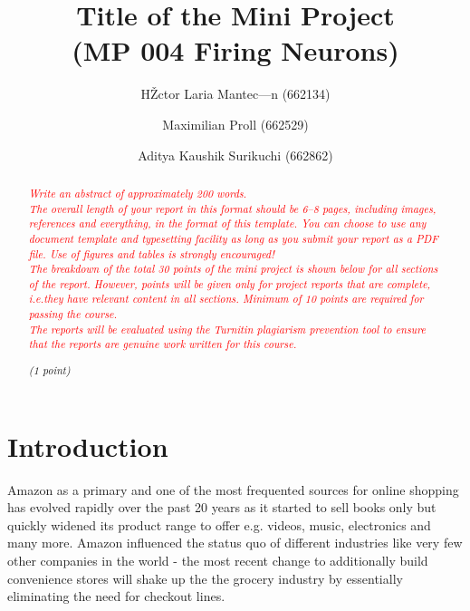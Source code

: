 \documentclass[a4paper,11pt]{article}
\begin{document}
\title{Title of the Mini Project\\
\normalsize (MP 004 Firing Neurons)}

\author{HŽctor Laria Mantec—n (662134) \and Maximilian Proll (662529)
  \and Aditya Kaushik Surikuchi (662862)}

\maketitle

\newcommand{\points}[1]{\par\noindent\textit{(#1 points)}}
\newcommand{\onepoint}{\par\noindent\textit{(1 point)}}
\newcommand{\defaulttext}[1]{\textit{\textcolor{red}{#1}}}

\begin{abstract}
  \defaulttext{Write an abstract of approximately 200 words. \\
  The overall length of your report in this format should be 6--8
  pages, including images, references and everything, in the format of
  this template.  You can choose to use any document template and
  typesetting facility as long as you submit your report as a PDF file.
  Use of figures and tables is strongly encouraged!\\
  The breakdown of the total 30 points of the mini project is shown
  below for all sections of the report. However, points will be given
  only for project reports that are complete, i.e.\@ they have
  relevant content in all sections.  Minimum of 10 points are required
  for passing the course.  \\
  The reports will be evaluated using the Turnitin plagiarism
  prevention tool to ensure that the reports are genuine work written
  for this course.}
  \onepoint
\end{abstract}

\section{Introduction}

Amazon as a primary and one of the most frequented sources for online shopping has evolved rapidly over the past 20 years as it started to sell books only but quickly widened its product range to offer e.g. videos, music, electronics and many more. Amazon influenced the status quo of different industries like very few other companies in the world - the most recent change to additionally build convenience stores will shake up the the grocery industry by essentially eliminating the need for checkout lines.
\end{document}
